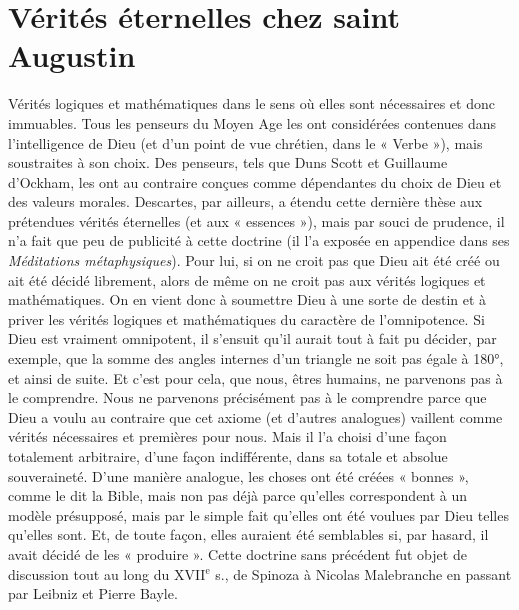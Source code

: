 
\chapter{Vérités éternelles chez saint Augustin}

Vérités logiques et mathématiques dans le
sens où elles sont nécessaires et donc
immuables. Tous les penseurs du Moyen
Age les ont considérées contenues dans
l'intelligence de Dieu (et d’un point de
vue chrétien, dans le « Verbe »), mais
soustraites à son choix. Des penseurs, tels
que Duns Scott et Guillaume d’Ockham,
les ont au contraire conçues comme
dépendantes du choix de Dieu et des
valeurs morales. Descartes, par ailleurs, a
étendu cette dernière thèse aux prétendues
vérités éternelles (et aux « essences »),
mais par souci de prudence, il n’a
fait que peu de publicité à cette doctrine
(il l’a exposée en appendice dans ses
{\it Méditations métaphysiques}). Pour lui, si
on ne croit pas que Dieu ait été créé ou
ait été décidé librement, alors de même
on ne croit pas aux vérités logiques et
mathématiques. On en vient donc à soumettre
Dieu à une sorte de destin et à priver
les vérités logiques et mathématiques
du caractère de l’omnipotence. Si Dieu
est vraiment omnipotent, il s’ensuit qu’il
aurait tout à fait pu décider, par exemple,
que la somme des angles internes d’un
triangle ne soit pas égale à 180°, et ainsi
de suite. Et c’est pour cela, que nous,
êtres humains, ne parvenons pas à le
comprendre. Nous ne parvenons précisément
pas à le comprendre parce que Dieu
a voulu au contraire que cet axiome (et
d’autres analogues)  vaillent comme
vérités nécessaires et premières pour
nous. Mais il l’a choisi d’une façon totalement
arbitraire, d’une façon indifférente,
dans sa totale et absolue souveraineté.
D'une manière analogue, les choses ont
été créées « bonnes », comme le dit la
Bible, mais non pas déjà parce qu’elles
correspondent à un modèle présupposé,
mais par le simple fait qu’elles ont été
voulues par Dieu telles qu’elles sont. Et,
de toute façon, elles auraient été semblables
si, par hasard, il avait décidé de
les « produire ». Cette doctrine sans précédent
fut objet de discussion tout au long
du {\footnotesize XVII}$^\text{e}$ s., de Spinoza à Nicolas Malebranche
en passant par Leibniz et Pierre
Bayle.

